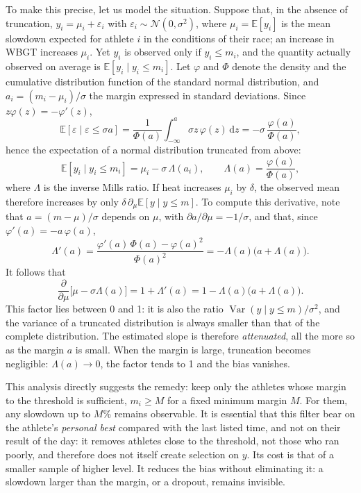 \documentclass[11pt,a4paper]{article}
\newcommand{\E}{\mathbb{E}}
\DeclareMathOperator{\Var}{Var}
\newcommand{\dd}{\mathrm{d}}
\begin{document}
To make this precise, let us model the situation. Suppose that, in the absence of truncation,
$y_i = \mu_i + \varepsilon_i$ with $\varepsilon_i \sim \mathcal{N}(0, \sigma^2)$, where $\mu_i = \E[y_i]$ is the
mean slowdown expected for athlete $i$ in the conditions of their race; an increase in WBGT increases $\mu_i$. Yet
$y_i$ is observed only if $y_i \leq m_i$, and the quantity actually observed on average is
$\E[y_i \mid y_i \leq m_i]$. Let $\varphi$ and $\Phi$ denote the density and the cumulative distribution function of
the standard normal distribution, and $a_i = (m_i - \mu_i)/\sigma$ the margin expressed in standard deviations. Since
$z\varphi(z) = -\varphi'(z)$,
\[
\E[\varepsilon \mid \varepsilon \leq \sigma a] = \frac{1}{\Phi(a)}\int_{-\infty}^a \sigma z\,\varphi(z)\,\dd z
= -\sigma\,\frac{\varphi(a)}{\Phi(a)},
\]
hence the expectation of a normal distribution truncated from above:
\begin{equation}\label{eq:truncation}
\E[y_i \mid y_i \leq m_i] = \mu_i - \sigma\,\Lambda(a_i), \qquad \Lambda(a) = \frac{\varphi(a)}{\Phi(a)},
\end{equation}
where $\Lambda$ is the inverse Mills ratio. If heat increases $\mu_i$ by $\delta$, the observed mean therefore increases
by only $\delta\,\partial_\mu \E[y \mid y \leq m]$. To compute this derivative, note that $a = (m - \mu)/\sigma$
depends on $\mu$, with $\partial a/\partial \mu = -1/\sigma$, and that, since $\varphi'(a) = -a\,\varphi(a)$,
\[
\Lambda'(a) = \frac{\varphi'(a)\,\Phi(a) - \varphi(a)^2}{\Phi(a)^2} = -\Lambda(a)\big(a + \Lambda(a)\big).
\]
It follows that
\begin{equation}\label{eq:attenuation}
\frac{\partial}{\partial \mu}\big[\mu - \sigma\Lambda(a)\big] = 1 + \Lambda'(a) = 1 - \Lambda(a)\big(a + \Lambda(a)\big).
\end{equation}
This factor lies between 0 and 1: it is also the ratio $\Var(y \mid y \leq m)/\sigma^2$, and the variance of a
truncated distribution is always smaller than that of the complete distribution. The estimated slope is therefore
\emph{attenuated}, all the more so as the margin $a$ is small. When the margin is large, truncation becomes
negligible: $\Lambda(a) \to 0$, the factor tends to 1 and the bias vanishes.

This analysis directly suggests the remedy: keep only the athletes whose margin to the threshold is sufficient,
$m_i \geq M$ for a fixed minimum margin $M$. For them, any slowdown up to $M$\% remains observable. It is essential
that this filter bear on the athlete's \emph{personal best} compared with the last listed time, and not on their
result of the day: it removes athletes close to the threshold, not those who ran poorly, and therefore does not itself
create selection on $y$. Its cost is that of a smaller sample of higher level. It reduces the bias without
eliminating it: a slowdown larger than the margin, or a dropout, remains invisible.
\end{document}
